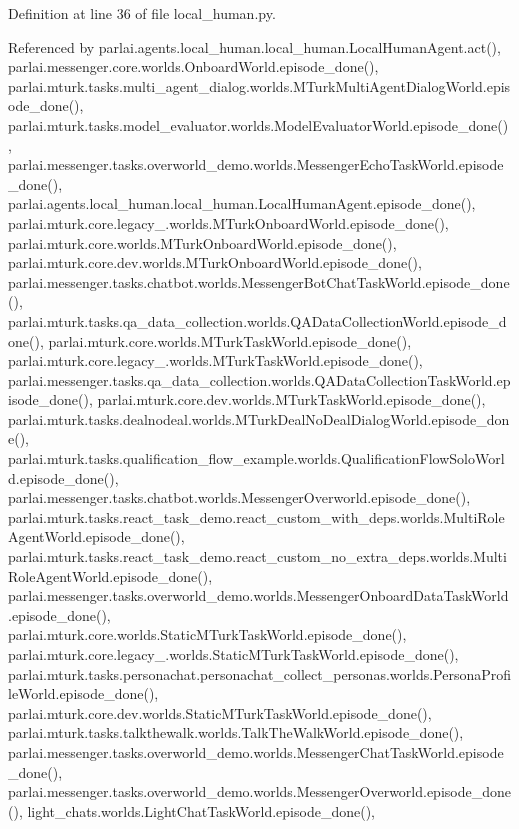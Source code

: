 Definition at line 36 of file local\+\_\+human.\+py.



Referenced by parlai.\+agents.\+local\+\_\+human.\+local\+\_\+human.\+Local\+Human\+Agent.\+act(), parlai.\+messenger.\+core.\+worlds.\+Onboard\+World.\+episode\+\_\+done(), parlai.\+mturk.\+tasks.\+multi\+\_\+agent\+\_\+dialog.\+worlds.\+M\+Turk\+Multi\+Agent\+Dialog\+World.\+episode\+\_\+done(), parlai.\+mturk.\+tasks.\+model\+\_\+evaluator.\+worlds.\+Model\+Evaluator\+World.\+episode\+\_\+done(), parlai.\+messenger.\+tasks.\+overworld\+\_\+demo.\+worlds.\+Messenger\+Echo\+Task\+World.\+episode\+\_\+done(), parlai.\+agents.\+local\+\_\+human.\+local\+\_\+human.\+Local\+Human\+Agent.\+episode\+\_\+done(), parlai.\+mturk.\+core.\+legacy\+\_.\+worlds.\+M\+Turk\+Onboard\+World.\+episode\+\_\+done(), parlai.\+mturk.\+core.\+worlds.\+M\+Turk\+Onboard\+World.\+episode\+\_\+done(), parlai.\+mturk.\+core.\+dev.\+worlds.\+M\+Turk\+Onboard\+World.\+episode\+\_\+done(), parlai.\+messenger.\+tasks.\+chatbot.\+worlds.\+Messenger\+Bot\+Chat\+Task\+World.\+episode\+\_\+done(), parlai.\+mturk.\+tasks.\+qa\+\_\+data\+\_\+collection.\+worlds.\+Q\+A\+Data\+Collection\+World.\+episode\+\_\+done(), parlai.\+mturk.\+core.\+worlds.\+M\+Turk\+Task\+World.\+episode\+\_\+done(), parlai.\+mturk.\+core.\+legacy\+\_.\+worlds.\+M\+Turk\+Task\+World.\+episode\+\_\+done(), parlai.\+messenger.\+tasks.\+qa\+\_\+data\+\_\+collection.\+worlds.\+Q\+A\+Data\+Collection\+Task\+World.\+episode\+\_\+done(), parlai.\+mturk.\+core.\+dev.\+worlds.\+M\+Turk\+Task\+World.\+episode\+\_\+done(), parlai.\+mturk.\+tasks.\+dealnodeal.\+worlds.\+M\+Turk\+Deal\+No\+Deal\+Dialog\+World.\+episode\+\_\+done(), parlai.\+mturk.\+tasks.\+qualification\+\_\+flow\+\_\+example.\+worlds.\+Qualification\+Flow\+Solo\+World.\+episode\+\_\+done(), parlai.\+messenger.\+tasks.\+chatbot.\+worlds.\+Messenger\+Overworld.\+episode\+\_\+done(), parlai.\+mturk.\+tasks.\+react\+\_\+task\+\_\+demo.\+react\+\_\+custom\+\_\+with\+\_\+deps.\+worlds.\+Multi\+Role\+Agent\+World.\+episode\+\_\+done(), parlai.\+mturk.\+tasks.\+react\+\_\+task\+\_\+demo.\+react\+\_\+custom\+\_\+no\+\_\+extra\+\_\+deps.\+worlds.\+Multi\+Role\+Agent\+World.\+episode\+\_\+done(), parlai.\+messenger.\+tasks.\+overworld\+\_\+demo.\+worlds.\+Messenger\+Onboard\+Data\+Task\+World.\+episode\+\_\+done(), parlai.\+mturk.\+core.\+worlds.\+Static\+M\+Turk\+Task\+World.\+episode\+\_\+done(), parlai.\+mturk.\+core.\+legacy\+\_.\+worlds.\+Static\+M\+Turk\+Task\+World.\+episode\+\_\+done(), parlai.\+mturk.\+tasks.\+personachat.\+personachat\+\_\+collect\+\_\+personas.\+worlds.\+Persona\+Profile\+World.\+episode\+\_\+done(), parlai.\+mturk.\+core.\+dev.\+worlds.\+Static\+M\+Turk\+Task\+World.\+episode\+\_\+done(), parlai.\+mturk.\+tasks.\+talkthewalk.\+worlds.\+Talk\+The\+Walk\+World.\+episode\+\_\+done(), parlai.\+messenger.\+tasks.\+overworld\+\_\+demo.\+worlds.\+Messenger\+Chat\+Task\+World.\+episode\+\_\+done(), parlai.\+messenger.\+tasks.\+overworld\+\_\+demo.\+worlds.\+Messenger\+Overworld.\+episode\+\_\+done(), light\+\_\+chats.\+worlds.\+Light\+Chat\+Task\+World.\+episode\+\_\+done(), 